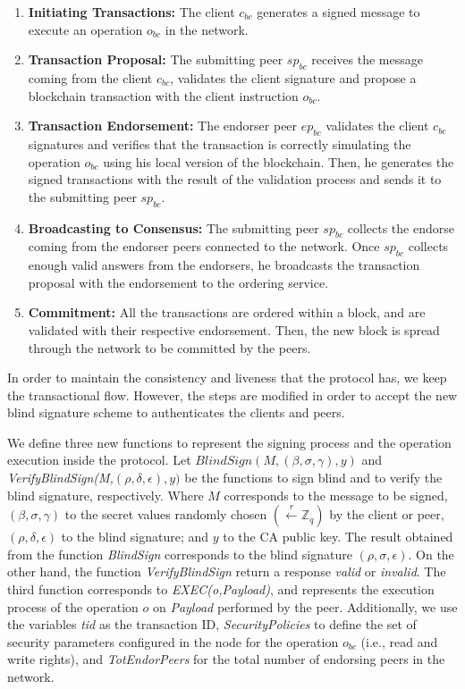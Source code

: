\documentclass[conference]{IEEEtran}
\begin{document}
\begin{enumerate}
    \item \textbf{Initiating Transactions:} The client $c_{bc}$ generates a signed message to execute an operation $o_{bc}$ in the network.
    \item \textbf{Transaction Proposal:} The submitting peer $sp_{bc}$ receives the message coming from the client $c_{bc}$, validates the client signature and propose a blockchain transaction with the client instruction $o_{bc}$.
    \item \textbf{Transaction Endorsement:} The endorser peer $ep_{bc}$ validates the client $c_{bc}$ signatures and verifies that the transaction is correctly simulating the operation $o_{bc}$ using his local version of the blockchain. Then, he generates the signed transactions with the result of the validation process and sends it to the submitting peer $sp_{bc}$.
    \item \textbf{Broadcasting to Consensus:} The submitting peer $sp_{bc}$ collects the endorse coming from the endorser peers connected to the network. Once $sp_{bc}$ collects enough valid answers from the endorsers, he broadcasts the transaction proposal with the endorsement to the ordering service.
    \item \textbf{Commitment:} All the transactions are ordered within a block, and are validated with their respective endorsement. Then, the new block is spread through the network to be committed by the peers.
\end{enumerate}

In order to maintain the consistency and liveness that the protocol has, we keep the transactional flow. However, the steps are modified in order to accept the new blind signature scheme to authenticates the clients and peers.

We define three new functions to represent the signing process and the operation execution inside the protocol. Let $BlindSign(M,(\beta,\sigma,\gamma),y)$ and \textit{VerifyBlindSign(M,}$(\rho,\delta,\epsilon),y)$ be the functions to sign blind and to verify the blind signature, respectively. Where $M$ corresponds to the message to be signed, $(\beta,\sigma,\gamma)$ to the secret values randomly chosen $(\xleftarrow[]{r}\mathbb{Z}_q)$ by the client or peer, $(\rho,\delta,\epsilon)$ to the blind signature; and $y$ to the CA public key. The result obtained from the function \textit{BlindSign} corresponds to the blind signature $(\rho,\sigma,\epsilon)$. On the other hand, the function \textit{VerifyBlindSign} return a response \textit{valid} or \textit{invalid}. The third function corresponds to \textit{EXEC(o,Payload)}, and represents the execution process of the operation $o$ on \textit{Payload} performed by the peer. Additionally, we use the variables \textit{tid} as the transaction ID, \textit{SecurityPolicies} to define the set of security parameters configured in the node for the operation $o_{bc}$ (i.e., read and write rights), and \textit{TotEndorPeers} for the total number of endorsing peers in the network.
\end{document}
